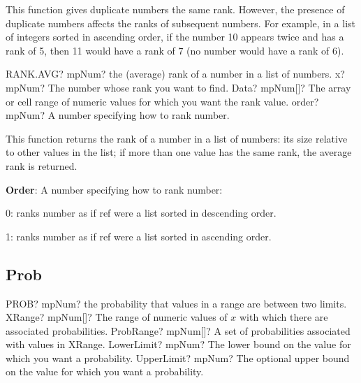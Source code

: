 \vspace{0.3cm}
This function gives duplicate numbers the same rank. However, the presence of duplicate numbers affects the ranks of subsequent numbers. For example, in a list of integers sorted in ascending order, if the number 10 appears twice and has a rank of 5, then 11 would have a rank of 7 (no number would have a rank of 6).


\vspace{0.6cm}
\begin{mpFunctionsExtract}
	\mpWorksheetFunctionThreeNotImplemented
	{RANK.AVG? mpNum? the (average) rank of a number in a list of numbers.}
	{x? mpNum? The number whose rank you want to find.}
	{Data? mpNum[]?  The array or cell range of numeric values for which you want the rank value.}
	{order? mpNum? A number specifying how to rank number.}
\end{mpFunctionsExtract}

\vspace{0.3cm}
This function returns the rank of a number in a list of numbers: its size relative to other values in the list; if more than one value has the same rank, the average rank is returned.


\vspace{0.3cm}
\textbf{\textsf{Order}}: A number specifying how to rank number:

0: ranks number as if ref were a list sorted in descending order.

1: ranks number as if ref were a list sorted in ascending order. 







\subsection{Prob}

\begin{mpFunctionsExtract}
	\mpWorksheetFunctionFourNotImplemented
	{PROB? mpNum? the probability that values in a range are between two limits.}
	{XRange? mpNum[]? The range of numeric values of $x$ with which there are associated probabilities.}
	{ProbRange? mpNum[]?  A set of probabilities associated with values in \textsf{XRange}.}
	{LowerLimit? mpNum? The lower bound on the value for which you want a probability.}
	{UpperLimit? mpNum? The optional upper bound on the value for which you want a probability.}
\end{mpFunctionsExtract}

